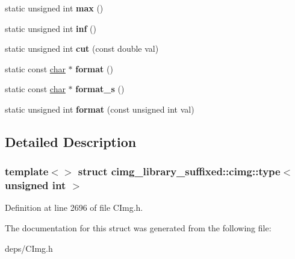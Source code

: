 \begin{DoxyCompactItemize}
static unsigned int {\bfseries max} ()
\item 
\mbox{\label{structcimg__library__suffixed_1_1cimg_1_1type_3_01unsigned_01int_01_4_a82e7fa61ed58b84a312383144b3f35c5}} 
static unsigned int {\bfseries inf} ()
\item 
\mbox{\label{structcimg__library__suffixed_1_1cimg_1_1type_3_01unsigned_01int_01_4_ac2a5f870a911680eddedb55c597d84fb}} 
static unsigned int {\bfseries cut} (const double val)
\item 
\mbox{\label{structcimg__library__suffixed_1_1cimg_1_1type_3_01unsigned_01int_01_4_a769c9d6dc4ea07fb114e1dd361382d70}} 
static const \hyperlink{classchar}{char} $\ast$ {\bfseries format} ()
\item 
\mbox{\label{structcimg__library__suffixed_1_1cimg_1_1type_3_01unsigned_01int_01_4_aa09de0761429bc1a44c8afd8c99481e9}} 
static const \hyperlink{classchar}{char} $\ast$ {\bfseries format\+\_\+s} ()
\item 
\mbox{\label{structcimg__library__suffixed_1_1cimg_1_1type_3_01unsigned_01int_01_4_a593652a22fb4f158deffec436521a2cc}} 
static unsigned int {\bfseries format} (const unsigned int val)
\end{DoxyCompactItemize}


\subsection{Detailed Description}
\subsubsection*{template$<$$>$\newline
struct cimg\+\_\+library\+\_\+suffixed\+::cimg\+::type$<$ unsigned int $>$}



Definition at line 2696 of file C\+Img.\+h.



The documentation for this struct was generated from the following file\+:\begin{DoxyCompactItemize}
\item 
deps/C\+Img.\+h\end{DoxyCompactItemize}

